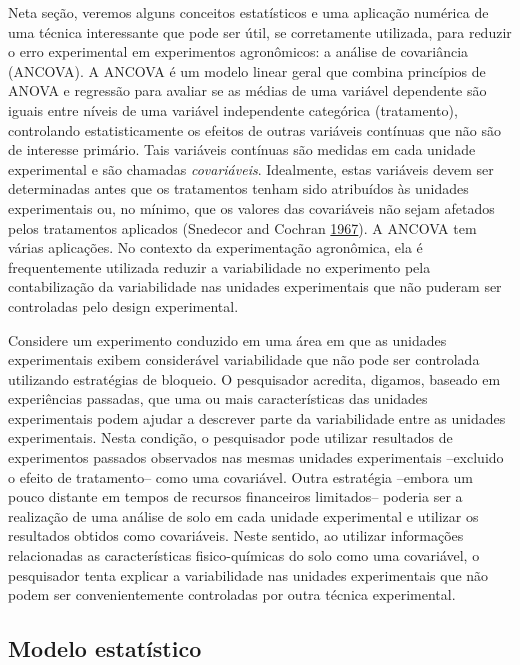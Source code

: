 \documentclass[
]{book}
\numberwithin{equation}{section}
\newcommand{\indt}[1]{\index{#1|ST}}
\begin{document}
Neta seção, veremos alguns conceitos estatísticos e uma aplicação numérica de uma técnica interessante que pode ser útil, se corretamente utilizada, para reduzir o erro experimental em experimentos agronômicos: a análise de covariância (ANCOVA). A ANCOVA\indt{ANCOVA} é um modelo linear geral que combina princípios de ANOVA\indt{ANOVA} e regressão para avaliar se as médias de uma variável dependente são iguais entre níveis de uma variável independente categórica (tratamento), controlando estatisticamente os efeitos de outras variáveis contínuas que não são de interesse primário. Tais variáveis contínuas são medidas em cada unidade experimental e são chamadas \emph{covariáveis}. Idealmente, estas variáveis devem ser determinadas antes que os tratamentos tenham sido atribuídos às unidades experimentais ou, no mínimo, que os valores das covariáveis não sejam afetados pelos tratamentos aplicados (Snedecor and Cochran \protect\hyperlink{ref-Snedecor1967}{1967}). A ANCOVA\indt{ANCOVA} tem várias aplicações. No contexto da experimentação agronômica, ela é frequentemente utilizada reduzir a variabilidade no experimento pela contabilização da variabilidade nas unidades experimentais que não puderam ser controladas pelo design experimental.

Considere um experimento conduzido em uma área em que as unidades experimentais exibem considerável variabilidade que não pode ser controlada utilizando estratégias de bloqueio. O pesquisador acredita, digamos, baseado em experiências passadas, que uma ou mais características das unidades experimentais podem ajudar a descrever parte da variabilidade entre as unidades experimentais. Nesta condição, o pesquisador pode utilizar resultados de experimentos passados observados nas mesmas unidades experimentais --excluido o efeito de tratamento-- como uma covariável. Outra estratégia --embora um pouco distante em tempos de recursos financeiros limitados-- poderia ser a realização de uma análise de solo em cada unidade experimental e utilizar os resultados obtidos como covariáveis. Neste sentido, ao utilizar informações relacionadas as características fisico-químicas do solo como uma covariável, o pesquisador tenta explicar a variabilidade nas unidades experimentais que não podem ser convenientemente controladas por outra técnica experimental.

\hypertarget{modelo-estatuxedstico-1}{%
\subsection{Modelo estatístico}\label{modelo-estatuxedstico-1}}
\end{document}
